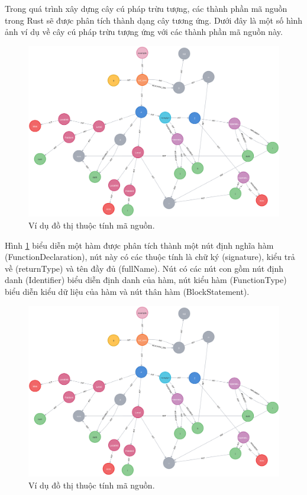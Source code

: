 

Trong quá trình xây dựng cây cú pháp trừu tượng, các thành phần mã nguồn trong Rust sẽ được phân tích thành dạng cây tương ứng.
Dưới đây là một số hình ảnh ví dụ về cây cú pháp trừu tượng ứng với các thành phần mã nguồn này.

\begin{figure}[H]
  \includegraphics[width=1\columnwidth]{figures/c2/c2_cpg.png}
  \centering
  \caption{Ví dụ đồ thị thuộc tính mã nguồn.}
  \label{img:c3_temp1}
\end{figure}

Hình \ref{img:c3_temp1} biểu diễn một hàm được phân tích thành một nút định nghĩa hàm (FunctionDeclaration), nút này có các thuộc tính là chữ ký (signature), kiểu trả về (returnType) và tên đầy đủ (fullName).
Nút có các nút con gồm nút định danh (Identifier) biểu diễn định danh của hàm, nút kiểu hàm (FunctionType) biểu diễn kiểu dữ liệu của hàm và nút thân hàm (BlockStatement).

\begin{figure}[H]
  \includegraphics[width=1\columnwidth]{figures/c2/c2_cpg.png}
  \centering
  \caption{Ví dụ đồ thị thuộc tính mã nguồn.}
  \label{img:c3_temp2}
\end{figure}

